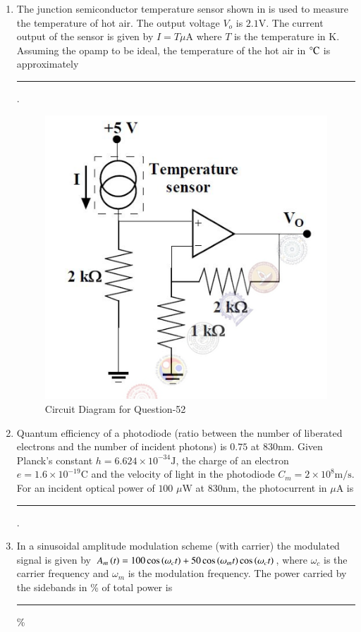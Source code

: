 \documentclass[journal,12pt,onecolumn]{IEEEtran}
\theoremstyle{remark}
\begin{document}
\begin{enumerate}
\item The junction semiconductor temperature sensor shown in  is used to measure the temperature of hot air. The output voltage $V_o$ is $2.1 \text{V}$. The current output of the sensor is given by $I = T \mu\text{A}$ where $T$ is the temperature in $\text{K}$. Assuming the opamp to be ideal, the temperature of the hot air in $\degree\text{C}$ is approximately \rule{1.5cm}{0.4pt}. \par \hfill{}
\begin{figure}[H]
    \centering
    \includegraphics[width=0.6\columnwidth]{Figs/Q-52.png}
    \caption{Circuit Diagram for Question-52}
    \label{f-25}
\end{figure}

\item Quantum efficiency of a photodiode (ratio between the number of liberated electrons and
the number of incident photons) is $0.75$ at $830 \text{nm}$. Given Planck's constant
$h = 6.624 \times 10^{-34}\text{J}$, the charge of an electron $e = 1.6 \times 10^{-19}\text{C}$ and the velocity of
light in the photodiode $C_m = 2 \times 10^{8}\text{m/s}$. For an incident optical power of $100$ $\mu\text{W}$ at
$830 \text{nm}$, the photocurrent in $\mu\text{A}$ is \rule{1.5cm}{0.4pt}. \par \hfill{}

\item In a sinusoidal amplitude modulation scheme (with carrier) the modulated signal is given
by $A_m\left(t\right) = 100 \cos\left(\omega_c t\right) + 50 \cos\left(\omega_m t\right) \cos\left(\omega_c t\right)$,
where $\omega_c$ is the carrier frequency and
$\omega_m$ is the modulation frequency. The power carried by the sidebands in \% of total power is \rule{1.5cm}{0.4pt} \% \par \hfill{}


\end{enumerate}
\end{document}
